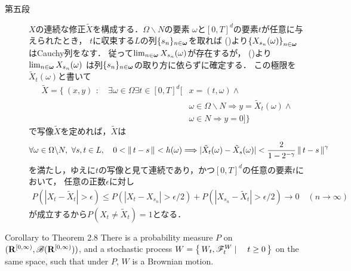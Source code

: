 \begin{prf}
\begin{description}
			\item[第五段]
				$X$の連続な修正$\tilde{X}$を構成する．$\Omega \backslash N$の要素
				$\omega$と$[0,T]^d$の要素$t$が任意に与えられたとき，
				$t$に収束する$L$の列$\{s_n\}_{n\in{\boldsymbol \omega}}$を取れば
				()より$\left\{X_{s_n}(\omega)\right\}_{n\in{\boldsymbol \omega}}$はCauchy列をなす．
				従って$\lim_{n \in {\boldsymbol \omega}}X_{s_n}(\omega)$が存在するが，
				()より$\lim_{n \in {\boldsymbol \omega}}X_{s_n}(\omega)$
				は列$\{s_n\}_{n\in{\boldsymbol \omega}}$の取り方に依らずに確定する．
				この極限を$\tilde{X}_t(\omega)$と書いて
				\begin{align}
					\tilde{X} = \Biggl\{\ (x,y)\ \, : \quad \exists \omega \in \Omega \exists t \in [0,T]^d [&x=(t,\omega) \wedge \\
					&\omega \in \Omega \backslash N \Longrightarrow y = \tilde{X}_t(\omega) \wedge \\
					&\omega \in N \Longrightarrow y=0] \Biggr\}
				\end{align}
				で写像$\tilde{X}$を定めれば，$\tilde{X}$は
				\begin{align}
					\forall \omega \in \Omega \backslash N,\
					\forall s,t \in L,\quad
					0 < \left\|\, t-s\, \right\|_{} < h(\omega)
					\Longrightarrow |\tilde{X}_t(\omega)-\tilde{X}_s(\omega)| < \frac{2}{1-2^{-\gamma}}
					\left\|\, t-s\, \right\|_{}^\gamma
				\end{align}
				を満たし，ゆえに$t$の写像と見て連続であり，かつ$[0,T]^d$の任意の要素$t$において，
				任意の正数$\epsilon$に対し
				\begin{align}
					P\left(\left|X_t - \tilde{X}_t\right| > \epsilon\right)
					\leq P\left(\left|X_t - X_{s_n}\right| > \epsilon/2\right) 
						+ P\left(\left|X_{s_n} - \tilde{X}_t\right| > \epsilon/2\right)
					\longrightarrow 0 \quad (n \longrightarrow \infty)
				\end{align}
				が成立するから$P(X_t \neq \tilde{X}_t) = 1$となる．
				\QED
		\end{description}
	\end{prf}
	
	\begin{itembox}[l]{Corollary to Theorem 2.8}
		There is a probability measure $P$ on $(\mathbf{R}^{[0,\infty)},\mathscr{B}(\mathbf{R}^{[0,\infty)}))$,
		and a stochastic process $W = \left\{\, W_t,\mathscr{F}_t^W \mid \quad t \geq 0\, \right\}$ on the same space,
		such that under $P$, $W$ is a Brownian motion.
	\end{itembox}
	
